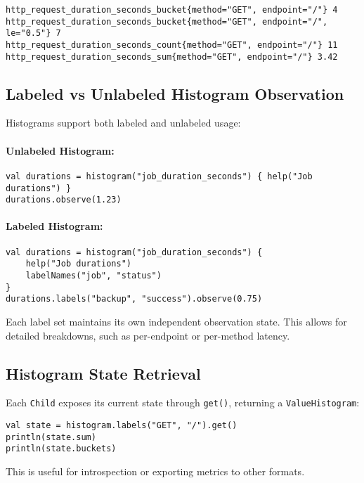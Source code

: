 \begin{verbatim}
http_request_duration_seconds_bucket{method="GET", endpoint="/"} 4
http_request_duration_seconds_bucket{method="GET", endpoint="/", le="0.5"} 7
http_request_duration_seconds_count{method="GET", endpoint="/"} 11
http_request_duration_seconds_sum{method="GET", endpoint="/"} 3.42
\end{verbatim}

\subsection{Labeled vs Unlabeled Histogram Observation}

Histograms support both labeled and unlabeled usage:

\paragraph{Unlabeled Histogram:}
\begin{verbatim}
val durations = histogram("job_duration_seconds") { help("Job durations") }
durations.observe(1.23)
\end{verbatim}

\paragraph{Labeled Histogram:}
\begin{verbatim}
val durations = histogram("job_duration_seconds") {
    help("Job durations")
    labelNames("job", "status")
}
durations.labels("backup", "success").observe(0.75)
\end{verbatim}

Each label set maintains its own independent observation state. This allows for detailed breakdowns, such as per-endpoint or per-method latency.

\subsection{Histogram State Retrieval}

Each \texttt{Child} exposes its current state through \texttt{get()}, returning a \texttt{ValueHistogram}:

\begin{verbatim}
val state = histogram.labels("GET", "/").get()
println(state.sum)
println(state.buckets)
\end{verbatim}

This is useful for introspection or exporting metrics to other formats.

